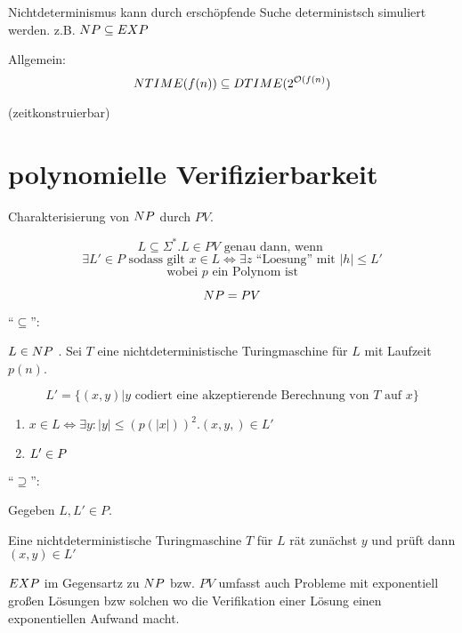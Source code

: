 Nichtdeterminismus kann durch erschöpfende Suche deterministsch simuliert werden.
z.B. $NP \subseteq EXP$


Allgemein:
$$NTIME(f(n)) \subseteq DTIME(2^{\mathcal{O}(f(n)})$$

(zeitkonstruierbar)


\section{polynomielle Verifizierbarkeit}


\begin{definition}
    
    Charakterisierung von $NP$ durch  $PV$.

    $$ L \subseteq \Sigma^\ast . L \in PV \text{ genau dann, wenn } $$
    $$ \exists L' \in P \text { sodass gilt } x \in L \Leftrightarrow  \exists z \text{ ``Loesung'' mit } |h| \leq L' $$
    $$ \text{ wobei } p \text{ ein Polynom ist } $$

\end{definition}


\begin{satz}
    $$ NP = PV $$
\end{satz}
\begin{beweis}
    ``$\subseteq$'':

    $L \in NP$ . Sei $T$ eine nichtdeterministische Turingmaschine für $L$ mit Laufzeit $p(n)$.

    $$ L' = \{(x,y) | y \text{ codiert eine akzeptierende Berechnung von } T \text{ auf } x \} $$

    \begin{enumerate}
        \item $x \in L \Leftrightarrow  \exists y: |y| \leq (p(|x|))^2 . (x,y,) \in L'$
        \item $L' \in P$
    \end{enumerate}


    ``$\supseteq$'':

     Gegeben $L, L' \in P$. 

     Eine nichtdeterministische Turingmaschine $T$ für $L$ rät zunächst $y$ und prüft dann $(x,y) \in L'$
\end{beweis}
  

$EXP$ im Gegensartz zu $NP$ bzw. $PV$ umfasst auch Probleme mit exponentiell großen Lösungen bzw solchen wo die Verifikation einer Lösung einen exponentiellen Aufwand macht.







